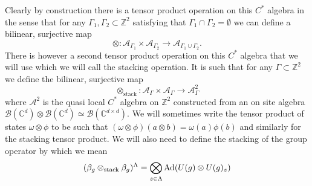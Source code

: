 \documentclass[12pt,a4paper,twoside]{article}
\let\originalleft\left
\let\originalright\right
\renewcommand{\left}{\mathopen{}\mathclose\bgroup\originalleft}
\renewcommand{\right}{\aftergroup\egroup\originalright}
\newcommand{\BB}{\mathcal B}
\newcommand{\ZZ}{\mathbb Z}
\newcommand{\CC}{\mathbb C}
\renewcommand{\AA}{\mathcal A}
\newcommand{\Ad}[1]{\textrm{Ad}\left(#1\right)}
\theoremstyle{definition}
\numberwithin{equation}{section}
\begin{document}
Clearly by construction there is a tensor product operation on this $C^*$ algebra in the sense that for any $\Gamma_1,\Gamma_2\subset\ZZ^2$ satisfying that $\Gamma_1\cap\Gamma_2=\emptyset$ we can define a bilinear, surjective map
\begin{equation}
	\otimes:\AA_{\Gamma_1}\times\AA_{\Gamma_2}\rightarrow \AA_{\Gamma_1\cup\Gamma_2}.
\end{equation}
There is however a second tensor product operation on this $C^*$ algebra that we will use which we will call the stacking operation. It is such that for any $\Gamma\subset\ZZ^2$ we define the bilinear, surjective map
\begin{equation}
	\otimes_{\text{stack}}:\AA_{\Gamma}\times\AA_{\Gamma}\rightarrow \AA^2_{\Gamma}
\end{equation}
where $\AA^2$ is the quasi local $C^*$ algebra on $\ZZ^2$ constructed from an on site algebra $\BB(\CC^d)\otimes\BB(\CC^d)\simeq \BB(\CC^{d\times d})$. We will sometimes write the tensor product of states $\omega\otimes\phi$ to be such that $(\omega\otimes\phi)(a\otimes b)=\omega(a)\phi(b)$ and similarly for the stacking tensor product. We will also need to define the stacking of the group operator by which we mean
\begin{equation}
	(\beta_g\otimes_{\text{stack}}\beta_g)^\Lambda=\bigotimes_{z\in\Lambda}\Ad{U(g)\otimes U(g)_z}
\end{equation}
\end{document}
